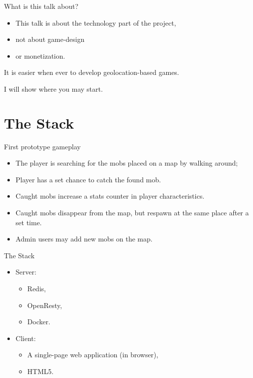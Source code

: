 \documentclass[aspectratio=169,handout,bigger]{beamer}
\begin{document}

\begin{frame}{What is this talk about?}
  \begin{itemize}
    \item This talk is about the technology part of the project,
    \item not about game-design
    \item or monetization.
  \end{itemize}
  \vspace*{1em}\par
  It is easier when ever to develop geolocation-based games.
  \vspace*{1em}\par
  I will show where you may start.
\end{frame}


\section{The Stack}


\begin{frame}{First prototype gameplay}
  \begin{itemize}
    \item The player is searching for
          the mobs placed on a map by walking around;
    \item Player has a set chance to catch the found mob.
    \item Caught mobs increase a stats counter in player characteristics.
    \item Caught mobs disappear from the map,
          but respawn at the same place after a set time.
    \item Admin users may add new mobs on the map.
  \end{itemize}
\end{frame}


\begin{frame}{The Stack}
  \begin{itemize}
    \item Server:
    \begin{itemize}
      \item Redis,
      \item OpenResty,
      \item Docker.
    \end{itemize}
    \item Client:
    \begin{itemize}
      \item A single-page web application (in browser),
      \item HTML5.
    \end{itemize}
  \end{itemize}
\end{frame}
\end{document}
